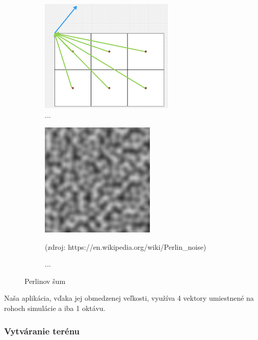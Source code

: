 \documentclass[12pt]{article}
\begin{document}
\begin{figure}[h]
	\centering

	\begin{subfigure}[t]{0.49\textwidth}
		\centering
		\includegraphics[width=0.7\textwidth]{res/prelinov_sum.png}
		\caption{...}
		\label{obr:perlinov sum}
	\end{subfigure}
	\hfill
	\begin{subfigure}[t]{0.49\textwidth}
		\centering
		\includegraphics[width=0.6\textwidth]{res/perlinov_sum_textura.png}
		\caption{...}
		\footnotesize (zdroj: https://en.wikipedia.org/wiki/Perlin\_noise)
		\label{obr:perlinov sum textura}
	\end{subfigure}

	\caption{Perlinov šum}
\end{figure}

Naša aplikácia, vďaka jej obmedzenej veľkosti, využíva 4 vektory umiestnené
na rohoch simulácie a iba 1 oktávu.

\subsubsection{Vytváranie terénu}
\end{document}
